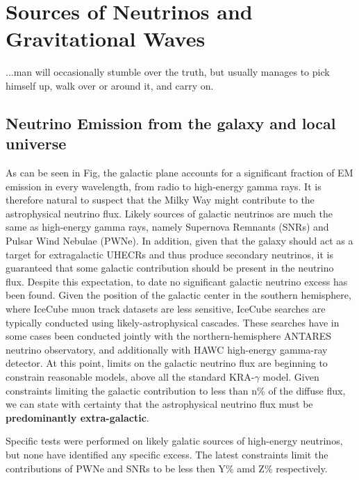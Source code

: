 \setchapterpreamble[u]{\margintoc}
\chapter{Sources of Neutrinos and Gravitational Waves}
\begin{fquote}...man will occasionally stumble over the truth, but usually manages to pick himself up, walk over or around it, and carry on. 
\end{fquote}


\section{Neutrino Emission from the galaxy and local universe}

As can be seen in Fig, the galactic plane accounts for a significant fraction of EM emission in every wavelength, from radio to high-energy gamma rays. It is therefore natural to suspect that the Milky Way might contribute to the astrophysical neutrino flux. Likely sources of galactic neutrinos are much the same as high-energy gamma rays, namely Supernova Remnants (SNRs) and Pulsar Wind Nebulae (PWNe). In addition, given that the galaxy should act as a target for extragalactic UHECRs and thus produce secondary neutrinos, it is guaranteed that some galactic contribution should be present in the neutrino flux. Despite this expectation, to date no significant galactic neutrino excess has been found. Given the position of the galactic center in the southern hemisphere, where IceCube muon track datasets are less sensitive, IceCube searches are typically conducted using likely-astrophysical cascades. These searches have in some cases been conducted jointly with the northern-hemisphere ANTARES neutrino observatory, and additionally with HAWC high-energy gamma-ray detector. At this point, limits on the galactic neutrino flux are beginning to constrain reasonable models, above all the standard KRA-$\gamma$ model. Given constraints limiting the galactic contribution to less than n\% of the diffuse flux, we can state with certainty that the astrophysical neutrino flux must be \textbf{predominantly extra-galactic}. 

Specific tests were performed on likely galatic sources of high-energy neutrinos, but none have identified any specific excess. The latest constraints limit the contributions of PWNe and SNRs to be less then Y\% amd Z\% respectively. 

